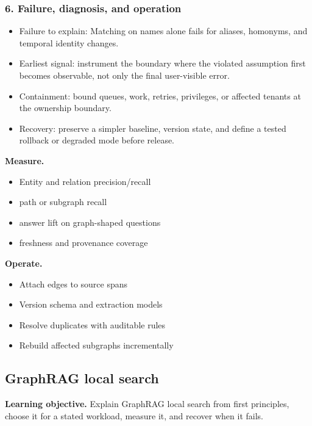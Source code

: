\subsubsection*{6. Failure, diagnosis, and operation}
\begin{itemize}
\item Failure to explain: Matching on names alone fails for aliases, homonyms, and temporal identity changes.
\item Earliest signal: instrument the boundary where the violated assumption first becomes observable, not only the final user-visible error.
\item Containment: bound queues, work, retries, privileges, or affected tenants at the ownership boundary.
\item Recovery: preserve a simpler baseline, version state, and define a tested rollback or degraded mode before release.
\end{itemize}
\textbf{Measure.}\begin{itemize}
\item Entity and relation precision/recall
\item path or subgraph recall
\item answer lift on graph-shaped questions
\item freshness and provenance coverage
\end{itemize}
\textbf{Operate.}\begin{itemize}
\item Attach edges to source spans
\item Version schema and extraction models
\item Resolve duplicates with auditable rules
\item Rebuild affected subgraphs incrementally
\end{itemize}
\subsection{GraphRAG local search}
\textbf{Learning objective.} Explain GraphRAG local search from first principles, choose it for a stated workload, measure it, and recover when it fails.
